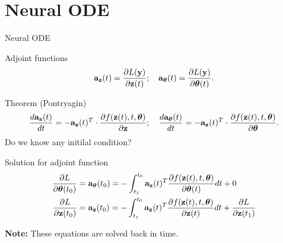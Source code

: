 \section{Neural ODE}
\begin{frame}{Neural ODE}
	\vspace{-0.3cm}
	\begin{block}{Adjoint functions}
		\vspace{-0.3cm}
		\[
		\mathbf{a}_{\mathbf{z}}(t) = \frac{\partial L(\mathbf{y})}{\partial \mathbf{z}(t)}; \quad \mathbf{a}_{\boldsymbol{\theta}}(t) = \frac{\partial L(\mathbf{y})}{\partial \boldsymbol{\theta}(t)}.
		\]
		\vspace{-0.6cm}
	\end{block}
	\begin{block}{Theorem (Pontryagin)}
		\vspace{-0.6cm}
		\[
		\frac{d \mathbf{a}_{\mathbf{z}}(t)}{dt} = - \mathbf{a}_{\mathbf{z}}(t)^T \cdot \frac{\partial f(\mathbf{z}(t), t, \boldsymbol{\theta})}{\partial \mathbf{z}}; \quad \frac{d \mathbf{a}_{\boldsymbol{\theta}}(t)}{dt} = - \mathbf{a}_{\mathbf{z}}(t)^T \cdot \frac{\partial f(\mathbf{z}(t),  t, \boldsymbol{\theta})}{\partial \boldsymbol{\theta}}.
		\]
		Do we know any initilal condition?
	\end{block}
	\begin{block}{Solution for adjoint function}
		\vspace{-0.8cm}
		\begin{align*}
			\frac{\partial L}{\partial \boldsymbol{\theta}(t_0)} &= \mathbf{a}_{\boldsymbol{\theta}}(t_0) =  - \int_{t_1}^{t_0} \mathbf{a}_{\mathbf{z}}(t)^T \frac{\partial f(\mathbf{z}(t), t, \boldsymbol{\theta})}{\partial \boldsymbol{\theta}(t)} dt + 0\\
			\frac{\partial L}{\partial \mathbf{z}(t_0)} &= \mathbf{a}_{\mathbf{z}}(t_0) =  - \int_{t_1}^{t_0} \mathbf{a}_{\mathbf{z}}(t)^T \frac{\partial f(\mathbf{z}(t), t, \boldsymbol{\theta})}{\partial \mathbf{z}(t)} dt + \frac{\partial L}{\partial \mathbf{z}(t_1)}\\
		\end{align*}
		\vspace{-1.2cm}
	\end{block}
	\textbf{Note:} These equations are solved back in time.
\end{frame}
